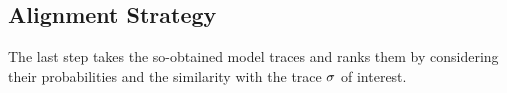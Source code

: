 






\subsection{Alignment Strategy}\label{subsec:as}
%
%








%
The last step takes the so-obtained model traces and ranks them by considering their probabilities and the similarity with the trace $\sigma$ of interest. %
